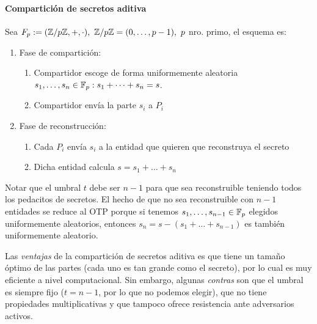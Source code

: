   \paragraph{Compartición de secretos aditiva}
  Sea $F_p := (\mathbb{Z}/p\mathbb{Z}, +, \cdot),\ \mathbb{Z}/p\mathbb{Z} = (0,\dots,p-1),\ p$ nro. primo, el esquema es:
  \begin{enumerate}
    \item Fase de compartición:
      \begin{enumerate}
        \item Compartidor escoge de forma uniformemente aleatoria $s_1,\dots,s_n\in\mathbb{F}_p : s_1+\dots+s_n=s$.
        \item Compartidor envía la parte $s_i$ a $P_i$
      \end{enumerate}
    \item Fase de reconstrucción:
      \begin{enumerate}
        \item Cada $P_i$ envía $s_i$ a la entidad que quieren que reconstruya el secreto 
        \item Dicha entidad calcula $s=s_1+\dots+s_n$
      \end{enumerate}
  \end{enumerate}
  \begin{remark}
    Notar que el umbral $t$ debe ser $n-1$ para que sea reconstruible teniendo todos los 
    pedacitos de secretos.
    El hecho de que no sea reconstruible con $n-1$ entidades se reduce al OTP porque si 
    tenemos $s_1,\dots,s_{n-1}\in\mathbb{F}_p$ elegidos uniformemente aleatorios, entonces 
    $s_n = s - (s_1+\dots+s_{n-1})$ es también uniformemente aleatorio.
  \end{remark}

  Las \textit{ventajas} de la compartición de secretos aditiva es que tiene un tamaño 
  óptimo de las partes (cada uno es tan grande como el secreto), por lo cual es 
  muy eficiente a nivel computacional.
  Sin embargo, algunas \textit{contras} son que el umbral es siempre fijo ($t = n-1$,
  por lo que no podemos elegir),
  que no tiene propiedades multiplicativas y que tampoco ofrece resistencia ante 
  adversarios activos.

